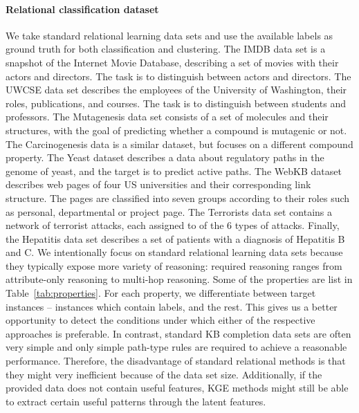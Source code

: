 \paragraph{Relational classification dataset}
We take standard relational learning data sets and use the available labels as ground truth for both classification and clustering.
The IMDB data set is a snapshot of the Internet Movie Database, describing a set of movies with their actors and directors. 
The task is to distinguish between actors and directors.
The UWCSE data set describes the employees of the University of Washington, their roles, publications, and courses.
The task is to distinguish between students and professors.
The Mutagenesis data set consists of a set of molecules and their structures, with the goal of predicting whether a compound is mutagenic or not.
The Carcinogenesis data is a similar dataset, but focuses on a different compound property.
The Yeast dataset describes a data about regulatory paths in the genome of yeast, and the target is to predict active paths.
The WebKB dataset describes web pages of four US universities and their corresponding link structure.
The pages are classified into seven groups according to their roles such as personal, departmental or project page.
The Terrorists data set contains a network of terrorist attacks, each assigned to of the 6 types of attacks.
Finally, the Hepatitis data set describes a set of patients with a diagnosis of Hepatitis B and C.
We intentionally focus on standard relational learning data sets because they typically expose more variety of reasoning: required reasoning ranges from attribute-only reasoning to multi-hop reasoning.
Some of the properties are list in Table~\ref{tab:properties}.
For each property, we differentiate between target instances -- instances which contain labels, and the rest.
This gives us a better opportunity to detect the conditions under which either of the respective approaches is preferable.
In contrast, standard KB completion data sets are often very simple and  only simple path-type rules are required to achieve a reasonable performance.
Therefore, the disadvantage of standard relational methods is that they might very inefficient because of the data set size.
Additionally, if the provided data does not contain useful features, KGE methods might still be able to extract certain useful patterns through the latent features.




